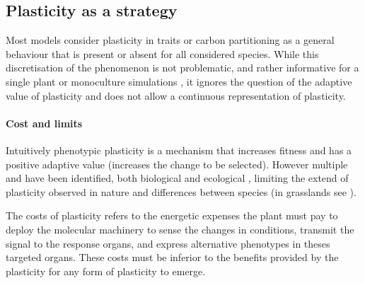 
\subsection{Plasticity as a strategy}

Most models consider plasticity in traits or carbon partitioning as a general behaviour that is present or absent for all considered species. While this discretisation of the phenomenon is not problematic, and rather informative for a single plant or monoculture simulations \cite{maire_plasticity_2013}, it ignores the question of the adaptive value of plasticity and does not allow a continuous representation of plasticity.



\paragraph{Cost and limits}

Intuitively phenotypic plasticity is a mechanism that increases fitness and has a positive adaptive value (increases the change to be selected). However multiple  and  have been identified, both biological \parencite{ dewitt_cost_1998, auld_re-evaluating_2009, callahan_phenotypic_2008} and ecological \parencite{dewitt_cost_1998, auld_re-evaluating_2009, scheiner_genetics_1989, scheiner_genetics_2002 ,scheiner_genetics_2012, van_kleunen_constraints_2005}, limiting the extend of plasticity observed in nature and differences between species (in grasslands see \cite{ryser_consequences_2000}).

The costs of plasticity refers to the energetic expenses the plant must pay to deploy the molecular machinery to sense the changes in conditions, transmit the signal to the response organs, and express alternative phenotypes in theses targeted organs. These costs must be inferior to the benefits provided by the plasticity for any form of plasticity to emerge.

